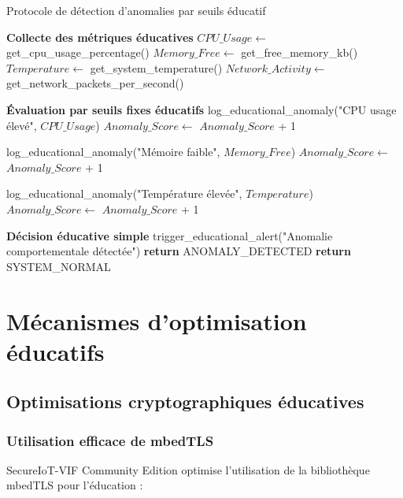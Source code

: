 \begin{algorithm}
\caption{Protocole de détection d'anomalies par seuils éducatif}
\label{alg:anomaly-detection-educational}
\begin{algorithmic}[1]
\State \textbf{Collecte des métriques éducatives}
\State $CPU\_Usage \leftarrow$ get\_cpu\_usage\_percentage()
\State $Memory\_Free \leftarrow$ get\_free\_memory\_kb()
\State $Temperature \leftarrow$ get\_system\_temperature()
\State $Network\_Activity \leftarrow$ get\_network\_packets\_per\_second()

\State \textbf{Évaluation par seuils fixes éducatifs}
    \State log\_educational\_anomaly("CPU usage élevé", $CPU\_Usage$)
    \State $Anomaly\_Score \leftarrow$ $Anomaly\_Score$ + 1
\EndIf

    \State log\_educational\_anomaly("Mémoire faible", $Memory\_Free$)
    \State $Anomaly\_Score \leftarrow$ $Anomaly\_Score$ + 1
\EndIf

    \State log\_educational\_anomaly("Température élevée", $Temperature$)
    \State $Anomaly\_Score \leftarrow$ $Anomaly\_Score$ + 1
\EndIf

\State \textbf{Décision éducative simple}
    \State trigger\_educational\_alert("Anomalie comportementale détectée")
    \State \textbf{return} ANOMALY\_DETECTED
\Else
    \State \textbf{return} SYSTEM\_NORMAL
\EndIf
\end{algorithmic}
\end{algorithm}

\section{Mécanismes d'optimisation éducatifs}

\subsection{Optimisations cryptographiques éducatives}

\subsubsection{Utilisation efficace de mbedTLS}

SecureIoT-VIF Community Edition optimise l'utilisation de la bibliothèque mbedTLS pour l'éducation :

